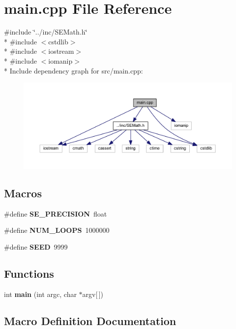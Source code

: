 \section{main.\+cpp File Reference}
\label{src_2main_8cpp}
{\ttfamily \#include \char`\"{}../inc/\+S\+E\+Math.\+h\char`\"{}}\\*
{\ttfamily \#include $<$cstdlib$>$}\\*
{\ttfamily \#include $<$iostream$>$}\\*
{\ttfamily \#include $<$iomanip$>$}\\*
Include dependency graph for src/main.cpp\+:
\nopagebreak
\begin{figure}[H]
\begin{center}
\leavevmode
\includegraphics[width=350pt]{src_2main_8cpp__incl}
\end{center}
\end{figure}
\subsection*{Macros}
\begin{DoxyCompactItemize}
\item 
\#define {\bf S\+E\+\_\+\+P\+R\+E\+C\+I\+S\+I\+O\+N}~float
\item 
\#define {\bf N\+U\+M\+\_\+\+L\+O\+O\+P\+S}~1000000
\item 
\#define {\bf S\+E\+E\+D}~9999
\end{DoxyCompactItemize}
\subsection*{Functions}
\begin{DoxyCompactItemize}
\item 
int {\bf main} (int argc, char $\ast$argv[$\,$])
\end{DoxyCompactItemize}


\subsection{Macro Definition Documentation}
